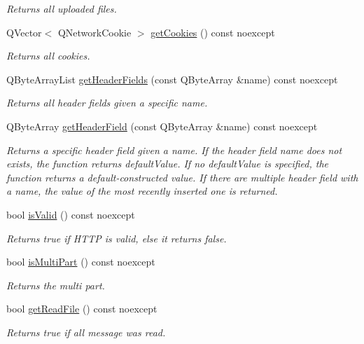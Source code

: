 \begin{DoxyCompactItemize}
\begin{DoxyCompactList}\small\item\em Returns all uploaded files. \end{DoxyCompactList}\item 
Q\+Vector$<$ Q\+Network\+Cookie $>$ \hyperlink{class_http_parser_ac07c6676461725678a6fe7fcae7e79f7}{get\+Cookies} () const noexcept
\begin{DoxyCompactList}\small\item\em Returns all cookies. \end{DoxyCompactList}\item 
Q\+Byte\+Array\+List \hyperlink{class_http_parser_ab29e0fad07ccfa2ad565d1cc32da76cc}{get\+Header\+Fields} (const Q\+Byte\+Array \&name) const noexcept
\begin{DoxyCompactList}\small\item\em Returns all header fields given a specific name. \end{DoxyCompactList}\item 
Q\+Byte\+Array \hyperlink{class_http_parser_adabda41fe6457ab14b573a32085c2eea}{get\+Header\+Field} (const Q\+Byte\+Array \&name) const noexcept
\begin{DoxyCompactList}\small\item\em Returns a specific header field given a name. If the header field name does not exists, the function returns default\+Value. If no default\+Value is specified, the function returns a default-\/constructed value. If there are multiple header field with a name, the value of the most recently inserted one is returned. \end{DoxyCompactList}\item 
bool \hyperlink{class_http_parser_a6d5020425a4dff7b78acbf37a20cccba}{is\+Valid} () const noexcept
\begin{DoxyCompactList}\small\item\em Returns true if H\+T\+TP is valid, else it returns false. \end{DoxyCompactList}\item 
bool \hyperlink{class_http_parser_a83946a3296e540751e5715d974dc12b1}{is\+Multi\+Part} () const noexcept
\begin{DoxyCompactList}\small\item\em Returns the multi part. \end{DoxyCompactList}\item 
bool \hyperlink{class_http_parser_a3be6ae977af47186d80b67f26b4cbd69}{get\+Read\+File} () const noexcept
\begin{DoxyCompactList}\small\item\em Returns true if all message was read. \end{DoxyCompactList}\end{DoxyCompactItemize}
